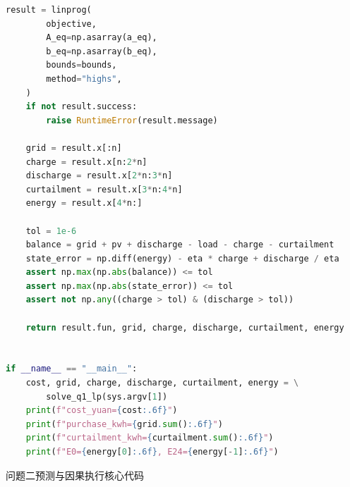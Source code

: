 \documentclass[UTF8,a4paper,12pt]{ctexart}
\begin{document}
\begin{lstlisting}[language=Python]
    result = linprog(
        objective,
        A_eq=np.asarray(a_eq),
        b_eq=np.asarray(b_eq),
        bounds=bounds,
        method="highs",
    )
    if not result.success:
        raise RuntimeError(result.message)

    grid = result.x[:n]
    charge = result.x[n:2*n]
    discharge = result.x[2*n:3*n]
    curtailment = result.x[3*n:4*n]
    energy = result.x[4*n:]

    tol = 1e-6
    balance = grid + pv + discharge - load - charge - curtailment
    state_error = np.diff(energy) - eta * charge + discharge / eta
    assert np.max(np.abs(balance)) <= tol
    assert np.max(np.abs(state_error)) <= tol
    assert not np.any((charge > tol) & (discharge > tol))

    return result.fun, grid, charge, discharge, curtailment, energy


if __name__ == "__main__":
    cost, grid, charge, discharge, curtailment, energy = \
        solve_q1_lp(sys.argv[1])
    print(f"cost_yuan={cost:.6f}")
    print(f"purchase_kwh={grid.sum():.6f}")
    print(f"curtailment_kwh={curtailment.sum():.6f}")
    print(f"E0={energy[0]:.6f}, E24={energy[-1]:.6f}")
\end{lstlisting}

问题二预测与因果执行核心代码
\end{document}
